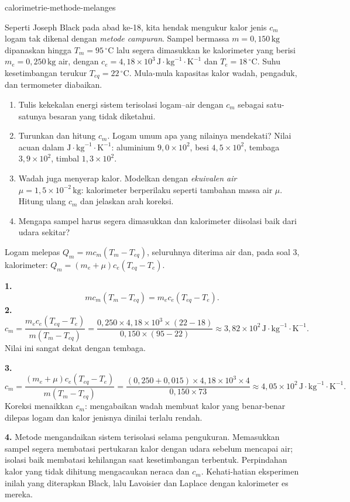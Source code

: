 \begin{exo}{calorimetrie-methode-melanges}

Seperti Joseph Black pada abad ke-18, kita hendak mengukur kalor jenis $c_m$ logam tak dikenal dengan \emph{metode campuran}. Sampel bermassa $m=0{,}150\,\text{kg}$ dipanaskan hingga $T_m=95\,^\circ\text{C}$ lalu segera dimasukkan ke kalorimeter yang berisi $m_e=0{,}250\,\text{kg}$ air, dengan $c_e=4{,}18\times10^3\,\text{J}\!\cdot\!\text{kg}^{-1}\!\cdot\!\text{K}^{-1}$ dan $T_e=18\,^\circ\text{C}$. Suhu kesetimbangan terukur $T_{eq}=22\,^\circ\text{C}$. Mula-mula kapasitas kalor wadah, pengaduk, dan termometer diabaikan.
\begin{enumerate}
  \item Tulis kekekalan energi sistem terisolasi logam–air dengan $c_m$ sebagai satu-satunya besaran yang tidak diketahui.
  \item Turunkan dan hitung $c_m$. Logam umum apa yang nilainya mendekati? Nilai acuan dalam $\text{J}\!\cdot\!\text{kg}^{-1}\!\cdot\!\text{K}^{-1}$: aluminium $9{,}0\times10^2$, besi $4{,}5\times10^2$, tembaga $3{,}9\times10^2$, timbal $1{,}3\times10^2$.
  \item Wadah juga menyerap kalor. Modelkan dengan \emph{ekuivalen air} $\mu=1{,}5\times10^{-2}\,\text{kg}$: kalorimeter berperilaku seperti tambahan massa air $\mu$. Hitung ulang $c_m$ dan jelaskan arah koreksi.
  \item Mengapa sampel harus segera dimasukkan dan kalorimeter diisolasi baik dari udara sekitar?
\end{enumerate}
\begin{indication}
Logam melepas $Q_m=mc_m(T_m-T_{eq})$, seluruhnya diterima air dan, pada soal 3, kalorimeter: $Q_m=(m_e+\mu)c_e(T_{eq}-T_e)$.
\end{indication}
\begin{solution}
\textbf{1.}
\[
mc_m(T_m-T_{eq})=m_ec_e(T_{eq}-T_e).
\]
\textbf{2.}
\[
c_m=\frac{m_ec_e(T_{eq}-T_e)}{m(T_m-T_{eq})}
=\frac{0{,}250\times4{,}18\times10^3\times(22-18)}{0{,}150\times(95-22)}
\approx3{,}82\times10^2\,\text{J}\!\cdot\!\text{kg}^{-1}\!\cdot\!\text{K}^{-1}.
\]
Nilai ini sangat dekat dengan tembaga.

\textbf{3.}
\[
c_m=\frac{(m_e+\mu)c_e(T_{eq}-T_e)}{m(T_m-T_{eq})}
=\frac{(0{,}250+0{,}015)\times4{,}18\times10^3\times4}{0{,}150\times73}
\approx4{,}05\times10^2\,\text{J}\!\cdot\!\text{kg}^{-1}\!\cdot\!\text{K}^{-1}.
\]
Koreksi menaikkan $c_m$: mengabaikan wadah membuat kalor yang benar-benar dilepas logam dan kalor jenisnya dinilai terlalu rendah.

\textbf{4.} Metode mengandaikan sistem terisolasi selama pengukuran. Memasukkan sampel segera membatasi pertukaran kalor dengan udara sebelum mencapai air; isolasi baik membatasi kehilangan saat kesetimbangan terbentuk. Perpindahan kalor yang tidak dihitung mengacaukan neraca dan $c_m$. Kehati-hatian eksperimen inilah yang diterapkan Black, lalu Lavoisier dan Laplace dengan kalorimeter es mereka.
\end{solution}
\end{exo}

